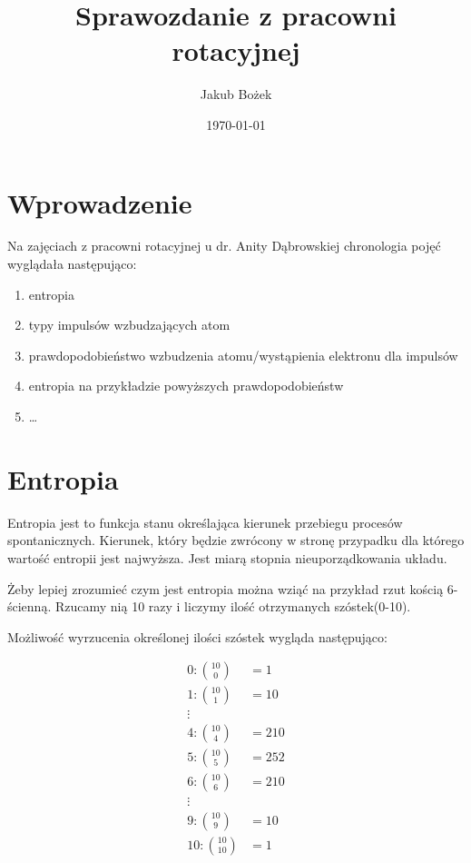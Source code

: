 \documentclass[11pt, a4paper, fleqn]{article}
\title{Sprawozdanie z pracowni rotacyjnej}
\author{Jakub Bożek}
\date{\today}
\begin{document}
\maketitle
\tableofcontents
\newpage


\section{Wprowadzenie}
    Na zajęciach z pracowni rotacyjnej u dr. Anity Dąbrowskiej
     chronologia pojęć wyglądała następująco:\\
    \begin{enumerate}
        \item entropia
        \item typy impulsów wzbudzających atom
        \item prawdopodobieństwo wzbudzenia atomu/wystąpienia elektronu dla impulsów
        \item entropia na przykładzie powyższych prawdopodobieństw
        \item \dots
    \end{enumerate}


\section{Entropia}
    Entropia jest to funkcja stanu określająca kierunek przebiegu procesów spontanicznych. Kierunek, który będzie zwrócony w stronę
    przypadku dla którego wartość entropii jest najwyższa.
    Jest miarą stopnia nieuporządkowania układu.

    Żeby lepiej zrozumieć czym jest entropia można wziąć na przykład rzut kością 6-ścienną.
    Rzucamy nią 10 razy i liczymy ilość otrzymanych szóstek(0-10).

    Możliwość wyrzucenia określonej ilości szóstek wygląda następująco:

    \begin{align*}
        0: \binom{10}{0} &=1\\
        1: \binom{10}{1} &= 10\\
        \vdots&\\
        4: \binom{10}{4} &= 210\\
        5: \binom{10}{5} &= 252\\
        6: \binom{10}{6} &= 210\\
        \vdots&\\
        9: \binom{10}{9} &= 10\\
        10: \binom{10}{10} &= 1
    \end{align*}
\end{document}
